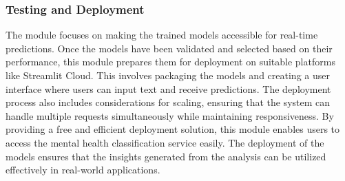 \subsubsection{Testing and Deployment}
\noindent
The module focuses on making the trained models accessible for real-time predictions. Once the models have been validated and selected based on their performance, this module prepares them for deployment on suitable platforms like Streamlit Cloud. This involves packaging the models and creating a user interface where users can input text and receive predictions. The deployment process also includes considerations for scaling, ensuring that the system can handle multiple requests simultaneously while maintaining responsiveness. By providing a free and efficient deployment solution, this module enables users to access the mental health classification service easily. The deployment of the models ensures that the insights generated from the analysis can be utilized effectively in real-world applications.










